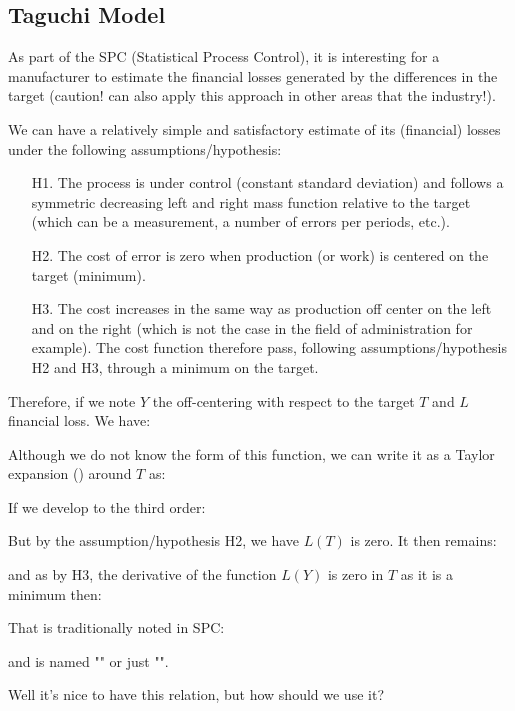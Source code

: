 	\pagebreak
	\subsection{Taguchi Model}
	As part of the SPC (Statistical Process Control), it is interesting for a manufacturer to estimate the financial losses generated by the differences in the target (caution! can also apply this approach in other areas that the industry!).
	
	We can have a relatively simple and satisfactory estimate of its (financial) losses under the following assumptions/hypothesis:
	\begin{enumerate}
		\item[H1.] The process is under control (constant standard deviation) and follows a symmetric decreasing left and right mass function relative to the target (which can be a measurement, a number of errors per periods, etc.).
		\item[H2.] The cost of error is zero when production (or work) is centered on the target (minimum).
		
		 \item[H3.] The cost increases in the same way as production off center on the left and on the right (which is not the case in the field of administration for example). The cost function therefore pass, following assumptions/hypothesis H2 and H3, through a minimum on the target.
	\end{enumerate}
	Therefore, if we note  $Y$ the off-centering with respect to the target $T$ and $L$ financial loss. We have:
	
	Although we do not know the form of this function, we can write it as a Taylor expansion () around $T$ as:
	
	If we develop to the third order:
		
	But by the assumption/hypothesis H2, we have $L (T)$ is zero. It then remains:
	
	and as by H3, the derivative of the function $L (Y)$ is zero in $T$ as it is a minimum then:
	
	That is traditionally noted in SPC:
	
	and is named "" or just "".
	
	Well it's nice to have this relation, but how should we use it?
	
